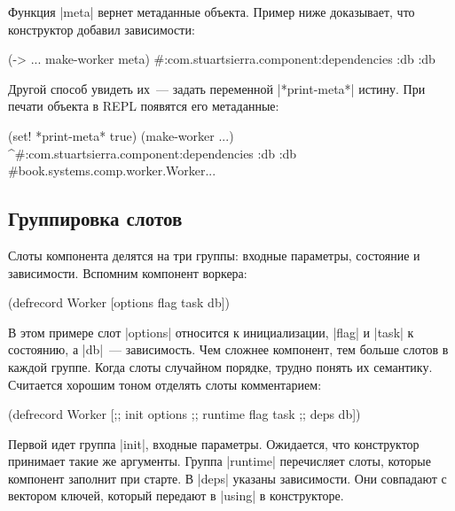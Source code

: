 Функция \spverb|meta| вернет метаданные объекта. Пример ниже доказывает, что
конструктор добавил зависимости:

\begin{english}
  \begin{clojure}
(-> {...} make-worker meta)
#:com.stuartsierra.component{:dependencies {:db :db}}
  \end{clojure}
\end{english}

Другой способ увидеть их~--- задать переменной \spverb|*print-meta*| истину. При
печати объекта в REPL появятся его метаданные:

\begin{english}
  \begin{clojure}
(set! *print-meta* true)
(make-worker {...})
^#:com.stuartsierra.component{:dependencies {:db :db}}
#book.systems.comp.worker.Worker{...}
  \end{clojure}
\end{english}

\subsection{Группировка слотов}

Слоты компонента делятся на три группы: входные параметры, состояние и
зависимости. Вспомним компонент воркера:

\begin{english}
  \begin{clojure}
(defrecord Worker
    [options flag task db])
  \end{clojure}
\end{english}

В этом примере слот \spverb|options| относится к инициализации, \spverb|flag| и
\spverb|task| к состоянию, а \spverb|db|~--- зависимость. Чем сложнее компонент,
тем больше слотов в каждой группе. Когда слоты случайном порядке, трудно понять
их семантику. Считается хорошим тоном отделять слоты комментарием:

\begin{english}
  \begin{clojure}
(defrecord Worker
    [;; init
     options
     ;; runtime
     flag
     task
     ;; deps
     db])
  \end{clojure}
\end{english}

Первой идет группа \spverb|init|, входные параметры. Ожидается, что конструктор
принимает такие же аргументы. Группа \spverb|runtime| перечисляет слоты, которые
компонент заполнит при старте. В \spverb|deps| указаны зависимости. Они
совпадают с вектором ключей, который передают в \spverb|using| в конструкторе.

